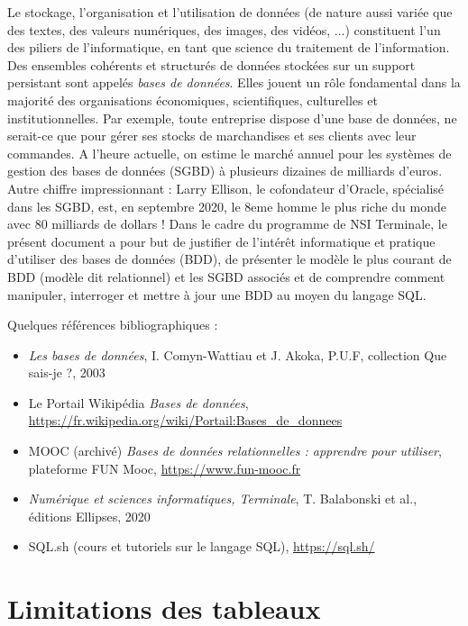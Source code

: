 \documentclass[11pt,a4paper,french,twoside]{PMCours}
\begin{document}

Le stockage, l'organisation et l'utilisation de données (de nature aussi variée que des textes, des valeurs numériques, des images, des vidéos, ...) constituent l'un des piliers de l'informatique, en tant que science du traitement de l'information. Des ensembles cohérents et structurés de données stockées sur un support persistant sont appelés \emph{bases de données}. Elles jouent un rôle fondamental dans la majorité des organisations économiques, scientifiques, culturelles et institutionnelles. Par exemple, toute entreprise dispose d'une base de données, ne serait-ce que pour gérer ses stocks de marchandises et ses clients avec leur commandes. A l'heure actuelle, on estime le marché annuel pour les systèmes de gestion des bases de données (SGBD) à plusieurs dizaines de milliards d'euros. Autre chiffre impressionnant : Larry Ellison, le cofondateur d'Oracle, spécialisé dans les SGBD, est, en septembre 2020, le 8eme homme le plus riche du monde avec 80 milliards de dollars ! Dans le cadre du programme de NSI Terminale, le présent document a pour but de justifier de l'intérêt informatique et pratique d'utiliser des bases de données (BDD), de présenter le modèle le plus courant de BDD (modèle dit relationnel) et les SGBD associés et de comprendre comment manipuler, interroger et mettre à jour une BDD au moyen du langage SQL.


Quelques références bibliographiques :
\begin{itemize}
 \item \emph{Les bases de données}, I. Comyn-Wattiau et J. Akoka, P.U.F, collection Que sais-je ?, 2003
 \item Le Portail Wikipédia \emph{Bases de données}, \url{https://fr.wikipedia.org/wiki/Portail:Bases_de_donnees}
 \item MOOC (archivé) \emph{Bases de données relationnelles : apprendre pour utiliser}, plateforme FUN Mooc, \url{https://www.fun-mooc.fr}
 \item \emph{Numérique et sciences informatiques, Terminale}, T. Balabonski et al., éditions Ellipses, 2020
 \item SQL.sh (cours et tutoriels sur le langage SQL), \url{https://sql.sh/}
\end{itemize}


\section{Limitations des tableaux}
\end{document}
